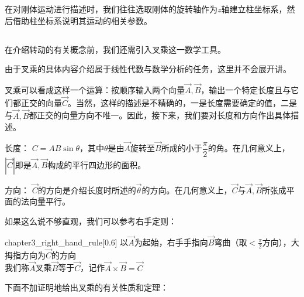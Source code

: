 在对刚体运动进行描述时，我们往往选取刚体的旋转轴作为$z$轴建立柱坐标系，然后借助柱坐标系说明其运动的相关参数。


\subsection[叉乘]{}
在介绍转动的有关概念前，我们还需引入叉乘这一数学工具。

由于叉乘的具体内容介绍属于线性代数与数学分析的任务，这里并不会展开讲。

叉乘可以看成这样一个运算：按顺序输入两个向量$\vec{A},\vec{B}$，输出一个特定长度且与它们都正交的向量$\vec{C}$。当然，这样的描述是不精确的，一是长度需要确定的值，二是与$\vec{A},\vec{B}$都正交的向量方向不唯一。因此，接下来，我们要对长度和方向作出具体描述。

\begin{Itemize}
    \item 长度： $C=AB\sin\theta$，其中$\theta$是由$\vec{A}$旋转至$\vec{B}$所成的小于$\dfrac{\pi}{2}$的角\footnotemark 。在几何意义上，$|\vec{C}|$即是$\vec{A},\vec{B}$构成的平行四边形的面积。
    \item 方向： $\vec{C}$的方向是介绍长度时所述的$\vec{\theta}$的方向。在几何意义上，$\vec{C}$与$\vec{A},\vec{B}$所张成平面的法向量平行。
\end{Itemize}

如果这么说不够直观，我们可以参考右手定则：

\begin{singlefigure}{chapter3_right_hand_rule}[0.6]
    以$\vec{A}$为起始，右手手指向$\vec{B}$弯曲（取$<\frac{\pi}{2}$方向），大拇指方向为$\vec{C}$的方向\\
    我们称$\vec{A}$叉乘$\vec{B}$等于$\vec{C}$，记作$\vec{A}\times\vec{B}=\vec{C}$
\end{singlefigure}

下面不加证明地给出叉乘的有关性质和定理：

